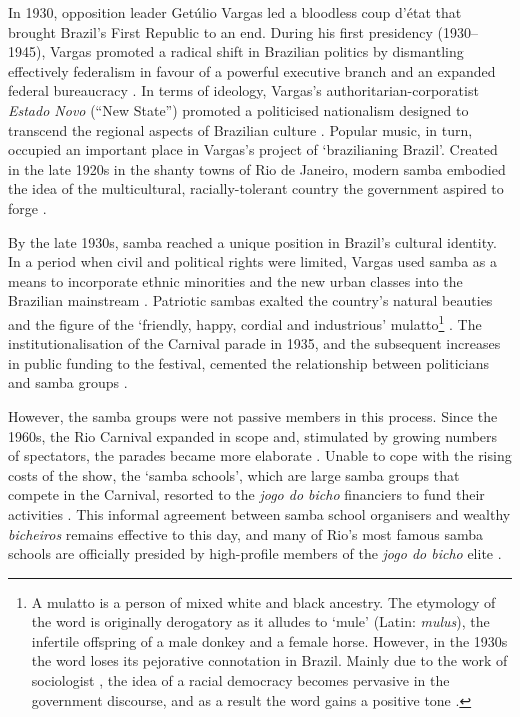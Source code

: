 \documentclass[a4paper,12pt]{article}
\begin{document}
In 1930, opposition leader Getúlio Vargas led a bloodless coup d'état that brought Brazil's First Republic to an end. During his first presidency (1930--1945), Vargas promoted a radical shift in Brazilian politics by dismantling effectively federalism in favour of a powerful executive branch and an expanded federal bureaucracy \citep[e.g.][]{bethell2008politicsvargas,fausto1972revoluccao,skidmore1967politics}. In terms of ideology, Vargas's authoritarian-corporatist \emph{Estado Novo} (``New State'') promoted a politicised nationalism designed to transcend the regional aspects of Brazilian culture \citep{lauerhass1972getulio,williams2001culture}. Popular music, in turn, occupied an important place in Vargas's project of `brazilianing Brazil'. Created in the late 1920s in the shanty towns of Rio de Janeiro, modern samba embodied the idea of the multicultural, racially-tolerant country the government aspired to forge \citep{mccann2004hello,stockler2011samba}.

By the late 1930s, samba reached a unique position in Brazil's cultural identity. In a period when civil and political rights were limited, Vargas used samba as a means to incorporate ethnic minorities and the new urban classes into the Brazilian mainstream \citep[213]{chinelli1993vazio}. Patriotic sambas exalted the country's natural beauties and the figure of the `friendly, happy, cordial and industrious' mulatto\footnote{A mulatto is a person of mixed white and black ancestry. The etymology of the word is originally derogatory as it alludes to `mule' (Latin: \emph{mulus}), the infertile offspring of a male donkey and a female horse. However, in the 1930s the word loses its pejorative connotation in Brazil. Mainly due to the work of sociologist \citet{freyre1933casa}, the idea of a racial democracy becomes pervasive in the government discourse, and as a result the word gains a positive tone \citep[4]{reiter2009brazil}.} \citep[51]{vianna1995misterio}. The institutionalisation of the Carnival parade in 1935, and the subsequent increases in public funding to the festival, cemented the relationship between politicians and samba groups \citep{cabral2016escolas,soihet1998subversao}.

However, the samba groups were not passive members in this process. Since the 1960s, the Rio Carnival expanded in scope and, stimulated by growing numbers of spectators, the parades became more elaborate \citetext{\citealp{cabral2016escolas}; \citealp[214]{chinelli1993vazio}; \citealp[240]{hertzman2013making}}. Unable to cope with the rising costs of the show, the `samba schools', which are large samba groups that compete in the Carnival, resorted to the \emph{jogo do bicho} financiers to fund their activities \citep{misse2007illegal}. This informal agreement between samba school organisers and wealthy \emph{bicheiros} remains effective to this day, and many of Rio's most famous samba schools are officially presided by high-profile members of the \emph{jogo do bicho} elite \citep{bezerra2009mecenato,cavalcanti2006carnaval,misse2011crime,queiroz1992carnaval}.
\end{document}

